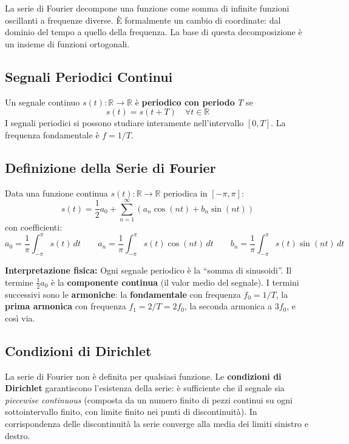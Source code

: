 \documentclass[
  italian,
  openany]{book}
\begin{document}
La serie di Fourier decompone una funzione come somma di infinite
funzioni oscillanti a frequenze diverse. È formalmente un cambio di
coordinate: dal dominio del tempo a quello della frequenza. La base di
questa decomposizione è un insieme di funzioni ortogonali.

\subsection{Segnali Periodici
Continui}\label{segnali-periodici-continui}

Un segnale continuo \(s(t): \mathbb{R} \to \mathbb{R}\) è
\textbf{periodico con periodo \(T\)} se
\[s(t) = s(t + T) \quad \forall t \in \mathbb{R}\] I segnali periodici
si possono studiare interamente nell'intervallo \([0, T]\). La frequenza
fondamentale è \(f = 1/T\).

\subsection{Definizione della Serie di
Fourier}\label{definizione-della-serie-di-fourier}

Data una funzione continua \(s(t): \mathbb{R} \to \mathbb{R}\) periodica
in \([-\pi, \pi]\):
\[s(t) = \frac{1}{2} a_0 + \sum_{n=1}^{\infty} \left( a_n \cos(nt) + b_n \sin(nt) \right)\]
con coefficienti:
\[a_0 = \frac{1}{\pi} \int_{-\pi}^{\pi} s(t)\, dt \qquad a_n = \frac{1}{\pi} \int_{-\pi}^{\pi} s(t) \cos(nt)\, dt \qquad b_n = \frac{1}{\pi} \int_{-\pi}^{\pi} s(t) \sin(nt)\, dt\]

\textbf{Interpretazione fisica:} Ogni segnale periodico è la ``somma di
sinusoidi''. Il termine \(\frac{1}{2} a_0\) è la \textbf{componente
continua} (il valor medio del segnale). I termini successivi sono le
\textbf{armoniche}: la \textbf{fondamentale} con frequenza
\(f_0 = 1/T\), la \textbf{prima armonica} con frequenza
\(f_1 = 2/T = 2f_0\), la seconda armonica a \(3f_0\), e così via.

\subsection{Condizioni di Dirichlet}\label{condizioni-di-dirichlet}

La serie di Fourier non è definita per qualsiasi funzione. Le
\textbf{condizioni di Dirichlet} garantiscono l'esistenza della serie: è
sufficiente che il segnale sia \emph{piecewise continuous} (composta da
un numero finito di pezzi continui su ogni sottointervallo finito, con
limite finito nei punti di discontinuità). In corrispondenza delle
discontinuità la serie converge alla media dei limiti sinistro e destro.
\end{document}
